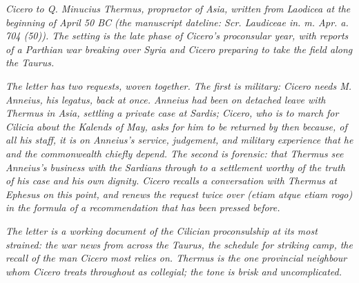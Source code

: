 
\textit{Cicero to Q. Minucius Thermus, propraetor of Asia, written
from Laodicea at the beginning of April 50 BC (the manuscript dateline:
\textit{Scr. Laudiceae in. m. Apr. a. 704 (50)}). The setting is the
late phase of Cicero's proconsular year, with reports of a Parthian
war breaking over Syria and Cicero preparing to take the field along
the Taurus.}

\textit{The letter has two requests, woven together. The first is
military: Cicero needs M. Anneius, his \textit{legatus}, back at
once. Anneius had been on detached leave with Thermus in Asia, settling
a private case at Sardis; Cicero, who is to march for Cilicia about
the Kalends of May, asks for him to be returned by then because, of
all his staff, it is on Anneius's service, judgement, and military
experience that he and the commonwealth chiefly depend. The second is
forensic: that Thermus see Anneius's business with the Sardians through
to a settlement worthy of the truth of his case and his own dignity.
Cicero recalls a conversation with Thermus at Ephesus on this point,
and renews the request twice over (\textit{etiam atque etiam rogo})
in the formula of a recommendation that has been pressed before.}

\textit{The letter is a working document of the Cilician proconsulship
at its most strained: the war news from across the Taurus, the
schedule for striking camp, the recall of the man Cicero most relies
on. Thermus is the one provincial neighbour whom Cicero treats
throughout as collegial; the tone is brisk and uncomplicated.}
